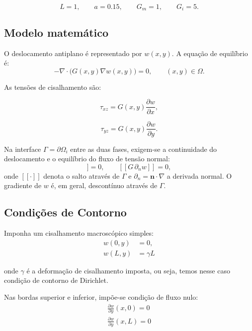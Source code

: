 \documentclass[brazil]{TCAM} %
\begin{document}
\begin{equation*}
    L = 1,
\qquad
a = 0.15,
\qquad
G_m = 1,
\qquad
G_i = 5.
\end{equation*}

\subsection{Modelo matemático}

O deslocamento antiplano é representado por $w(x,y)$. A equação de equilíbrio é:
\begin{equation}
    -\nabla \cdot \bigl(G(x,y)\nabla w(x,y)\bigr)=0,
\qquad
(x,y)\in\Omega.
\label{eq}
\end{equation}

As tensões de cisalhamento são:

\[
\tau_{xz}
=
G(x,y)\frac{\partial w}{\partial x},
\]

\[
\tau_{yz}
=
G(x,y)\frac{\partial w}{\partial y}.
\]

Na interface $\Gamma=\partial\Omega_i$ entre as duas fases, exigem-se a
continuidade do deslocamento e o equilíbrio do fluxo de tensão normal:
\begin{equation}
    [\![ w ]\!] = 0,
    \qquad
    [\![ G\,\partial_n w ]\!] = 0,
    \label{eq:interface}
\end{equation}
onde $[\![\cdot]\!]$ denota o salto através de $\Gamma$ e
$\partial_n = \mathbf{n}\cdot\nabla$ a derivada normal. O gradiente de $w$ é, em
geral, descontínuo através de $\Gamma$.

\subsection{Condições de Contorno}

Imponha um cisalhamento macroscópico simples:
\begin{eqnarray}
    w(0,y)&= 0, \\
    w(L,y)&= \gamma L
\end{eqnarray}

onde \(\gamma\) é a deformação de cisalhamento imposta, ou seja,  temos nesse caso condição de contorno de Dirichlet.

Nas bordas superior e inferior, impõe-se condição de fluxo nulo:
\begin{eqnarray}
    \frac{\partial w}{\partial y}(x,0)=0 \\
    \frac{\partial w}{\partial y}(x,L)=0
    \label{contorno}
\end{eqnarray}
\end{document}
